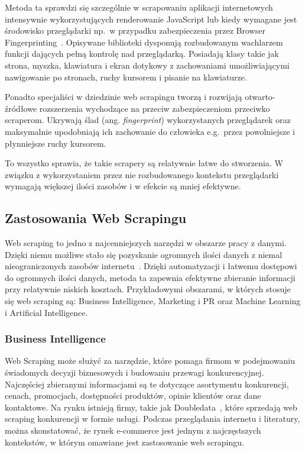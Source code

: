 Metoda ta sprawdzi się szczególnie w scrapowaniu aplikacji internetowych intensywnie wykorzystujących renderowanie JavaScript
lub kiedy wymagane jest środowisko przeglądarki np.~w przypadku zabezpieczenia przez Browser Fingerprinting~\cite{apify-headless-browsers}.
Opisywane biblioteki dysponują rozbudowanym wachlarzem funkcji dających pełną kontrolę nad przeglądarką.
Posiadają klasy takie jak strona, myszka, klawiatura i ekran dotykowy z zachowaniami umożliwiającymi nawigowanie po stronach,
ruchy kursorem i pisanie na klawiaturze.

Ponadto specjaliści w dziedzinie web scrapingu tworzą i rozwijają otwarto-źródłowe rozszerzenia wychodzące na przeciw zabezpieczeniom przeciwko scraperom.
Ukrywają ślad (ang. \emph{fingerprint}) wykorzystanych przeglądarek oraz maksymalnie upodobniają ich zachowanie do człowieka e.g.~przez powolniejsze i płynniejsze ruchy kursorem.

To wszystko sprawia, że takie scrapery są relatywnie łatwe do stworzenia.
W związku z wykorzystaniem przez nie rozbudowanego kontekstu przeglądarki wymagają większej ilości zasobów i w efekcie są mniej efektywne.

\subsection{Zastosowania Web Scrapingu}\label{subsec:web-scraping-applications}

Web scraping to jedno z najcenniejszych narzędzi w obszarze pracy z danymi.
Dzięki niemu możliwe stało się pozyskanie ogromnych ilości danych z niemal nieograniczonych zasobów internetu~\cite{Zhao2017}.
Dzięki automatyzacji i łatwemu dostępowi do ogromnych ilości danych, metoda ta zapewnia efektywne zbieranie informacji przy relatywnie niskich kosztach.
Przykładowymi obszarami, w których stosuje się web scraping są: Business Intelligence, Marketing i PR oraz Machine Learning i Artificial Intelligence.

\subsubsection{Business Intelligence}
Web Scraping może służyć za narzędzie, które pomaga firmom w podejmowaniu świadomych decyzji biznesowych i budowaniu przewagi konkurencyjnej.
Najczęściej zbieranymi informacjami są te dotyczące asortymentu konkurencji, cenach, promocjach, dostępności produktów, opinie klientów oraz dane kontaktowe.
Na rynku istnieją firmy, takie jak Doubledata~\cite{doubledata}, które sprzedają web scraping konkurencji w formie usługi.
Podczas przeglądania internetu i literatury, można skonstatować, że rynek e-commerce jest jednym z najczęstszych kontekstów, w którym omawiane jest zastosowanie web scrapingu.


